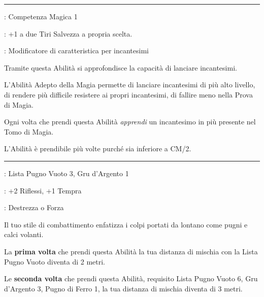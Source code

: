 \begin{multicols}{2}
\smallskip\noindent\rule{\linewidth}{2pt} \hypertarget{Adepto della Magia}{}\medskip{}
\noindent
\begin{description}[noitemsep, topsep=0pt, parsep=0pt, partopsep=0pt, leftmargin=0cm, labelwidth=2.5cm]
    \item[\textbf{Requisito}]: Competenza Magica 1
    \item[\textbf{Tiri Salvezza}]: +1 a due Tiri Salvezza a propria scelta.
    \item[\textbf{Caratteristica}]: Modificatore di caratteristica per incantesimi
\end{description}

Tramite questa Abilità si approfondisce la capacità di lanciare incantesimi.

L'Abilità Adepto della Magia permette di lanciare incantesimi di più alto livello, di rendere più difficile resistere ai propri incantesimi, di fallire meno nella Prova di Magia.

Ogni volta che prendi questa Abilità \emph{apprendi} un incantesimo in più presente nel Tomo di Magia.

L'Abilità è prendibile più volte purché sia inferiore a CM/2.

\smallskip\noindent\rule{\linewidth}{2pt} \hypertarget{Ali della Fenice}{}\medskip{}
\noindent
\begin{description}[noitemsep, topsep=0pt, parsep=0pt, partopsep=0pt, leftmargin=0cm, labelwidth=2.5cm]
    \item[\textbf{Requisito}]: Lista Pugno Vuoto 3, Gru d'Argento 1
    \item[\textbf{Tiri Salvezza}]: +2 Riflessi, +1 Tempra
    \item[\textbf{Caratteristica}]: Destrezza o Forza
\end{description}

Il tuo stile di combattimento enfatizza i colpi portati da lontano come pugni e calci volanti.

La \textbf{prima volta} che prendi questa Abilità la tua distanza di mischia con la Lista Pugno Vuoto diventa di 2 metri.

Le \textbf{seconda volta} che prendi questa Abilità, requisito Lista Pugno Vuoto 6, Gru d'Argento 3, Pugno di Ferro 1, la tua distanza di mischia diventa di 3 metri.


\end{multicols}
